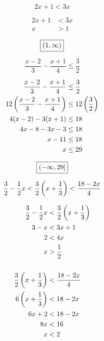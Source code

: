\documentclass[letterpaper, landscape]{exam}
\begin{document}
\begin{questions}
    \ifprintanswers{}
      \newpage
    \fi

    \question[5]
      \[
        2x + 1 < 3x
      \]

      \begin{solution}
        \begin{align*}
          2x + 1 & < 3x \\
          x      & > 1 \\
        \end{align*}
        \[
          \boxed{ \intoo{ 1, \infty } }
        \]
    \end{solution}

    \question[10]
      \[ 
        \frac{x - 2}{3} - \frac{x + 1}{4} \leq \frac{3}{2} 
      \]

      \begin{solution}
        \begin{align*}
          \frac{x - 2}{3} - \frac{x + 1}{4}            & \leq \frac{3}{2} \\
          12 \del{ \frac{x - 2}{3} - \frac{x + 1}{4} } & \leq 12 \del{ \frac{3}{2} } \\
          4(x - 2) - 3(x + 1)                          & \leq 18 \\
          4x - 8 - 3x - 3                              & \leq 18 \\
          x - 11                                       & \leq 18 \\
          x                                            & \leq 29 \\
        \end{align*}
        
        \[
          \boxed{ \intoc{ -\infty, 29 } }
        \]

      \end{solution}

    \question[10]
      \[ 
         \frac{3}{2} - \frac{1}{2} x < \frac{3}{2} \del{ x + \frac{1}{3} }  < \frac{18 - 2x}{4}
      \]

      \begin{solution}
        \begin{align*}
           \frac{3}{2} - \frac{1}{2} x & < \frac{3}{2} \del{ x + \frac{1}{3} } \\
           3 - x                       & < 3x + 1 \\
           2                           & < 4x \\
           x                           & > \frac{1}{2} \\
           \\
           \frac{3}{2} \del{ x + \frac{1}{3} } & < \frac{18 - 2x}{4} \\
           6 \del{ x + \frac{1}{3} }           & < 18 - 2x \\
           6x + 2                              & < 18 - 2x \\
           8x                                  & < 16 \\
           x                                   & < 2 \\
        \end{align*}


\end{solution}
\end{questions}
\end{document}
